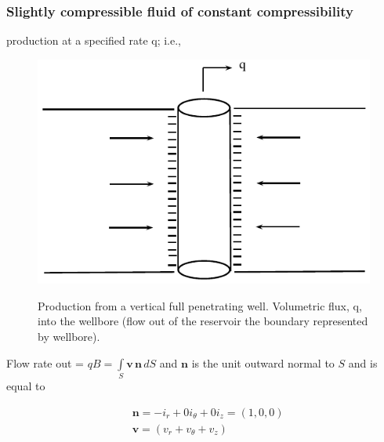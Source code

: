 \documentclass{llncs}
\numberwithin{equation}{section}
\numberwithin{figure}{section}
\numberwithin{table}{section}
\begin{document}
    \subsubsection{Slightly compressible fluid of constant compressibility}
    
     production at a specified rate q; i.e.,
    \begin{figure}
        \begin{center}
        \includegraphics[scale=1]{Production_Full.pdf}
        \label{Production_Full}
        \caption{Production from a vertical full penetrating well. Volumetric flux, q, into the wellbore (flow out of the reservoir the boundary represented by wellbore).}
        \end{center}
    \end{figure}    
    
    Flow rate out = $qB=\int\limits_{S}{\mathbf{v}\,\mathbf{n}\,dS}$ and $\mathbf{n}$ is the unit outward normal to $S$ and is equal to 
    
    \begin{equation*}
        \begin{split}
        & \mathbf{n}=-{{i}_{r}}+0{{i}_{\theta }}+0{{i}_{z}}=\left( 1,0,0 \right) \\
        & \mathbf{v}=\left( {{v}_{r}}+{{v}_{\theta }}+{{v}_{z}} \right) \\
        \end{split}
    \end{equation*}
    
\end{document}
